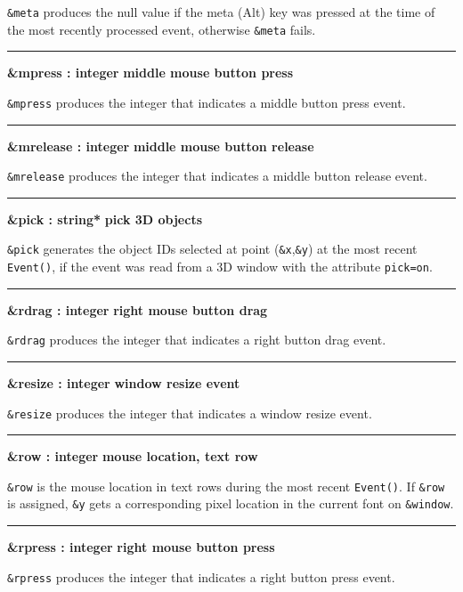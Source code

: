 \noindent
\texttt{\&meta} produces the null value if the meta (Alt) key was
pressed at the time of the most recently processed event, otherwise
\texttt{\&meta} fails.

\bigskip\hrule\vspace{0.1cm}
\noindent
{\bf \&mpress : integer } \hfill {\bf middle mouse button press}

\noindent
\texttt{\&mpress} produces the integer that indicates a middle button
press event.

\bigskip\hrule\vspace{0.1cm}
\noindent
{\bf \&mrelease : integer } \hfill {\bf middle mouse button release}

\noindent
\texttt{\&mrelease} produces the integer that indicates a middle button
release event.

\bigskip\hrule\vspace{0.1cm}
\noindent
{\bf \&pick : string* } \hfill {\bf pick 3D objects}

\noindent
\texttt{\&pick} generates the object IDs selected at point
(\texttt{\&x},\texttt{\&y}) at the most recent \texttt{Event()}, if the
event was read from a 3D window with the attribute \texttt{pick=on}.

\bigskip\hrule\vspace{0.1cm}
\noindent
{\bf \&rdrag : integer } \hfill {\bf right mouse button drag}

\noindent
\texttt{\&rdrag} produces the integer that indicates a right button drag
event.

\bigskip\hrule\vspace{0.1cm}
\noindent
{\bf \&resize : integer } \hfill {\bf window resize event}

\noindent
\texttt{\&resize} produces the integer that indicates a window resize
event.

\bigskip\hrule\vspace{0.1cm}
\noindent
{\bf \&row : integer } \hfill {\bf mouse location, text row}

\noindent
\texttt{\&row} is the mouse location in text rows during the most recent
\texttt{Event()}. If \texttt{\&row} is assigned, \texttt{\&y} gets a
corresponding pixel location in the current font on \texttt{\&window}.

\bigskip\hrule\vspace{0.1cm}
\noindent
{\bf \&rpress : integer } \hfill {\bf right mouse button press}

\noindent
\texttt{\&rpress} produces the integer that indicates a right button
press event.

